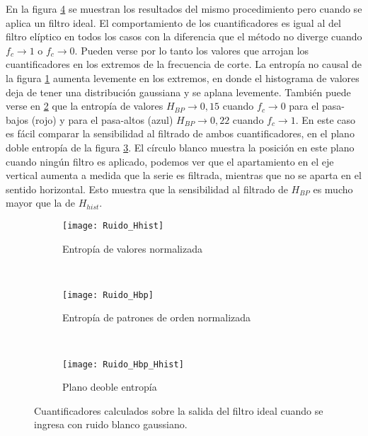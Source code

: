 En la figura \ref{fig:ideal} se muestran los resultados del mismo procedimiento pero cuando se aplica un filtro ideal.
El comportamiento de los cuantificadores es igual al del filtro elíptico en todos los casos con la diferencia que el método no diverge cuando $f_c\to1$ o $f_c\to0$.
Pueden verse por lo tanto los valores que arrojan los cuantificadores en los extremos de la frecuencia de corte.
La entropía no causal de la figura \ref{subfig:ideal_Hhist} aumenta levemente en los extremos, en donde el histograma de valores deja de tener una distribución gaussiana y se aplana levemente.
También puede verse en \ref{subfig:ideal_Hbp} que la entropía de valores $H_{BP}\to0,15$ cuando $f_c\to0$ para el pasa-bajos (rojo) y para el pasa-altos (azul) $H_{BP}\to0,22$ cuando $f_c\to1$.
En este caso es fácil comparar la sensibilidad al filtrado de ambos cuantificadores, en el plano doble entropía de la figura \ref{subfig:ideal_HbpHhist}.
El círculo blanco muestra la posición en este plano cuando ningún filtro es aplicado, podemos ver que el apartamiento en el eje vertical aumenta a medida que la serie es filtrada, mientras que no se aparta en el sentido horizontal.
Esto muestra que la sensibilidad al filtrado de $H_{BP}$ es mucho mayor que la de $H_{hist}$.
%
\begin{figure}[h]
    \centering
    \begin{subfigure}[t]{0.32\textwidth}
        \texttt{[image: Ruido\_Hhist]}
        \caption{Entropía de valores normalizada}
        \label{subfig:ideal_Hhist}
    \end{subfigure}
    ~ %
    \begin{subfigure}[t]{0.32\textwidth}
        \texttt{[image: Ruido\_Hbp]}
        \caption{Entropía de patrones de orden normalizada}
        \label{subfig:ideal_Hbp}
    \end{subfigure}
    ~ %
    \begin{subfigure}[t]{0.32\textwidth}
        \texttt{[image: Ruido\_Hbp\_Hhist]}
        \caption{Plano deoble entropía}
        \label{subfig:ideal_HbpHhist}
    \end{subfigure}
    \caption{Cuantificadores calculados sobre la salida del filtro ideal cuando se ingresa con ruido blanco gaussiano.}\label{fig:ideal}
\end{figure}

